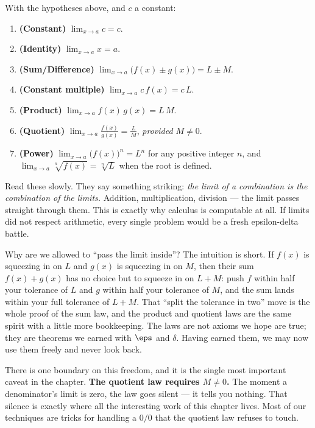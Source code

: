 \begin{theorem}
\label{ch07:thm-laws}
With the hypotheses above, and $c$ a constant:
\begin{enumerate}
  \item \textbf{(Constant)} $\displaystyle\lim_{x\to a} c = c$.
  \item \textbf{(Identity)} $\displaystyle\lim_{x\to a} x = a$.
  \item \textbf{(Sum/Difference)} $\displaystyle\lim_{x\to a}\big(f(x)\pm g(x)\big) = L \pm M$.
  \item \textbf{(Constant multiple)} $\displaystyle\lim_{x\to a} c\,f(x) = c\,L$.
  \item \textbf{(Product)} $\displaystyle\lim_{x\to a} f(x)\,g(x) = L\,M$.
  \item \textbf{(Quotient)} $\displaystyle\lim_{x\to a} \frac{f(x)}{g(x)} = \frac{L}{M}$, \emph{provided $M \neq 0$}.
  \item \textbf{(Power)} $\displaystyle\lim_{x\to a} \big(f(x)\big)^{n} = L^{n}$ for any positive integer $n$, and $\displaystyle\lim_{x\to a}\sqrt[n]{f(x)} = \sqrt[n]{L}$ when the root is defined.
\end{enumerate}
\end{theorem}

Read these slowly. They say something striking: \emph{the limit of a
combination is the combination of the limits.} Addition, multiplication,
division --- the limit passes straight through them. This is exactly why
calculus is computable at all. If limits did not respect arithmetic, every
single problem would be a fresh epsilon-delta battle.

\begin{whybox}
Why are we allowed to ``pass the limit inside''? The intuition is short. If
$f(x)$ is squeezing in on $L$ and $g(x)$ is squeezing in on $M$, then their
sum $f(x)+g(x)$ has no choice but to squeeze in on $L+M$: push $f$ within
half your tolerance of $L$ and $g$ within half your tolerance of $M$, and the
sum lands within your full tolerance of $L+M$. That ``split the tolerance in
two'' move is the whole proof of the sum law, and the product and quotient
laws are the same spirit with a little more bookkeeping. The laws are not
axioms we hope are true; they are theorems we earned with $\eps$ and $\delta$.
Having earned them, we may now use them freely and never look back.
\end{whybox}

There is one boundary on this freedom, and it is the single most important
caveat in the chapter. \textbf{The quotient law requires $M\neq 0$.} The
moment a denominator's limit is zero, the law goes silent --- it tells you
nothing. That silence is exactly where all the interesting work of this
chapter lives. Most of our techniques are tricks for handling a $0/0$ that
the quotient law refuses to touch.

